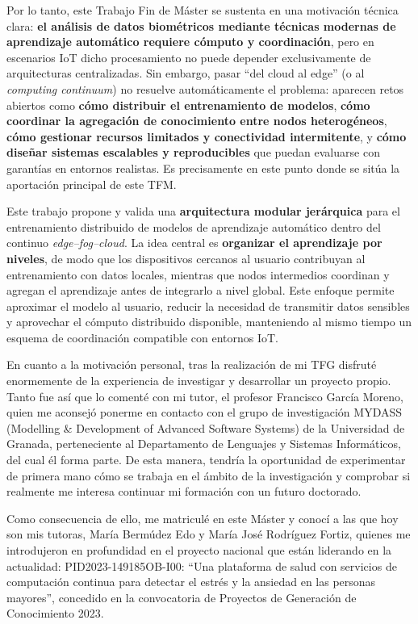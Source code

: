 \documentclass{report}
\begin{document}
Por lo tanto, este Trabajo Fin de Máster se sustenta en una motivación técnica clara: \textbf{el análisis de datos biométricos mediante técnicas modernas de aprendizaje automático requiere cómputo y coordinación}, pero en escenarios IoT dicho procesamiento no puede depender exclusivamente de arquitecturas centralizadas. Sin embargo, pasar ``del cloud al edge'' (o al \textit{computing continuum}) no resuelve automáticamente el problema: aparecen retos abiertos como \textbf{cómo distribuir el entrenamiento de modelos}, \textbf{cómo coordinar la agregación de conocimiento entre nodos heterogéneos}, \textbf{cómo gestionar recursos limitados y conectividad intermitente}, y \textbf{cómo diseñar sistemas escalables y reproducibles} que puedan evaluarse con garantías en entornos realistas. Es precisamente en este punto donde se sitúa la aportación principal de este TFM.

Este trabajo propone y valida una \textbf{arquitectura modular jerárquica} para el entrenamiento distribuido de modelos de aprendizaje automático dentro del continuo \textit{edge--fog--cloud}. La idea central es \textbf{organizar el aprendizaje por niveles}, de modo que los dispositivos cercanos al usuario contribuyan al entrenamiento con datos locales, mientras que nodos intermedios coordinan y agregan el aprendizaje antes de integrarlo a nivel global. Este enfoque permite aproximar el modelo al usuario, reducir la necesidad de transmitir datos sensibles y aprovechar el cómputo distribuido disponible, manteniendo al mismo tiempo un esquema de coordinación compatible con entornos IoT.


En cuanto a la motivación personal, tras la realización de mi TFG disfruté enormemente de la experiencia de investigar y desarrollar un proyecto propio. Tanto fue así que lo comenté con mi tutor, el profesor Francisco García Moreno, quien me aconsejó ponerme en contacto con el grupo de investigación MYDASS (Modelling \& Development of Advanced Software Systems) de la Universidad de Granada, perteneciente al Departamento de Lenguajes y Sistemas Informáticos, del cual él forma parte. De esta manera, tendría la oportunidad de experimentar de primera mano cómo se trabaja en el ámbito de la investigación y comprobar si realmente me interesa continuar mi formación con un futuro doctorado.

Como consecuencia de ello, me matriculé en este Máster y conocí a las que hoy son mis tutoras, María Bermúdez Edo y María José Rodríguez Fortiz, quienes me introdujeron en profundidad en el proyecto nacional que están liderando en la actualidad: PID2023-149185OB-I00: “Una plataforma de salud con servicios de computación continua para detectar el estrés y la ansiedad en las personas mayores”, concedido en la convocatoria de Proyectos de Generación de Conocimiento 2023.
\end{document}
